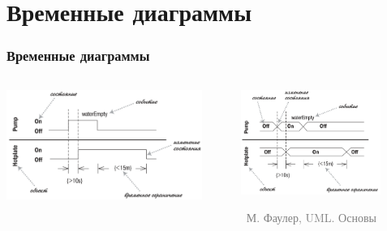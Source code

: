 \documentclass[xetex,mathserif,serif]{beamer}
\newcommand{\attribution}[1] {
    \vspace{-5mm}\begin{flushright}\begin{scriptsize}\textcolor{gray}{\textcopyright\, #1}\end{scriptsize}\end{flushright}
}
\begin{document}
    \section{Временные диаграммы}

    \begin{frame}
        \frametitle{Временные диаграммы}
        \begin{columns}
            \begin{column}{0.5\textwidth}
                \begin{center}
                    \includegraphics[width=0.9\textwidth]{timingDiagrams.png}
                \end{center}
            \end{column}
            \begin{column}{0.5\textwidth}
                \begin{center}
                    \includegraphics[width=0.8\textwidth]{timingDiagramsAlternate.png}
                    \attribution{М. Фаулер, UML. Основы}
                \end{center}
            \end{column}
        \end{columns}
    \end{frame}
\end{document}
